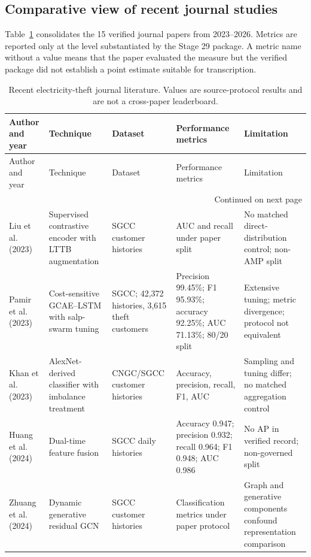 \subsection{Comparative view of recent journal studies}

Table~\ref{tab:recent-literature} consolidates the 15 verified journal papers from 2023--2026. Metrics are reported only at the level substantiated by the Stage 29 package. A metric name without a value means that the paper evaluated the measure but the verified package did not establish a point estimate suitable for transcription.

\begingroup
\small
\setlength{\tabcolsep}{3pt}
\begin{longtable}{@{}p{}p{}p{}p{}p{}@{}}
\caption{Recent electricity-theft journal literature. Values are source-protocol results and are not a cross-paper leaderboard.}\label{tab:recent-literature}\\
\toprule
Author and year & Technique & Dataset & Performance metrics & Limitation \\
\midrule
\endfirsthead
\toprule
Author and year & Technique & Dataset & Performance metrics & Limitation \\
\midrule
\endhead
\midrule
\multicolumn{5}{r}{Continued on next page}\\
\endfoot
\bottomrule
\endlastfoot
Liu et al. (2023) & Supervised contrastive encoder with LTTB augmentation & SGCC customer histories & AUC and recall under paper split & No matched direct-distribution control; non-AMP split \\
Pamir et al. (2023) & Cost-sensitive GCAE--LSTM with salp-swarm tuning & SGCC; 42,372 histories, 3,615 theft customers & Precision 99.45\%; F1 95.93\%; accuracy 92.25\%; AUC 71.13\%; 80/20 split & Extensive tuning; metric divergence; protocol not equivalent \\
Khan et al. (2023) & AlexNet-derived classifier with imbalance treatment & CNGC/SGCC customer histories & Accuracy, precision, recall, F1, AUC & Sampling and tuning differ; no matched aggregation control \\
Huang et al. (2024) & Dual-time feature fusion & SGCC daily histories & Accuracy 0.947; precision 0.932; recall 0.964; F1 0.948; AUC 0.986 & No AP in verified record; non-governed split \\
Zhuang et al. (2024) & Dynamic generative residual GCN & SGCC customer histories & Classification metrics under paper protocol & Graph and generative components confound representation comparison \\

\end{longtable}
